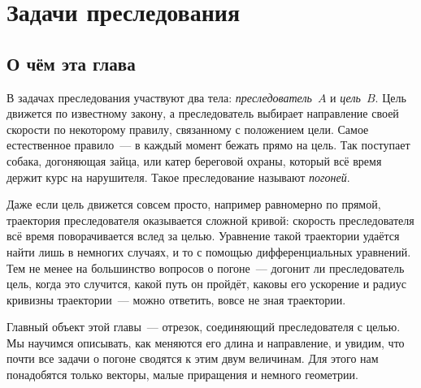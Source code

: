 \documentclass[../main.tex]{subfiles}
\begin{document}
\renewcommand{\thesection}{3*}
\renewcommand{\thesubsection}{3*.\arabic{subsection}}
\section{Задачи преследования}

\subsection{О чём эта глава}

В задачах преследования участвуют два тела: \textit{преследователь}~$A$ и
\textit{цель}~$B$. Цель движется по известному закону, а преследователь выбирает
направление своей скорости по некоторому правилу, связанному с положением цели.
Самое естественное правило~--- в каждый момент бежать прямо на цель. Так поступает
собака, догоняющая зайца, или катер береговой охраны, который всё время держит курс
на нарушителя. Такое преследование называют \textit{погоней}.

Даже если цель движется совсем просто, например равномерно по прямой, траектория
преследователя оказывается сложной кривой: скорость преследователя всё время
поворачивается вслед за целью. Уравнение такой траектории удаётся найти лишь в
немногих случаях, и то с помощью дифференциальных уравнений. Тем не менее на
большинство вопросов о погоне~--- догонит ли преследователь цель, когда это
случится, какой путь он пройдёт, каковы его ускорение и радиус кривизны
траектории~--- можно ответить, вовсе не зная траектории.

Главный объект этой главы~--- отрезок, соединяющий преследователя с целью. Мы
научимся описывать, как меняются его длина и направление, и увидим, что почти все
задачи о погоне сводятся к этим двум величинам. Для этого нам понадобятся только
векторы, малые приращения и немного геометрии.

\end{document}
